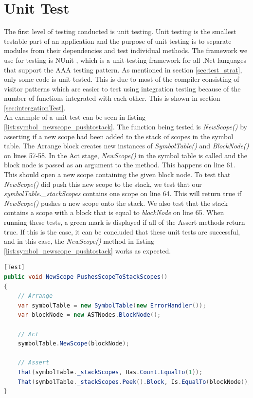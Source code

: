 \section{Unit Test}
The first level of testing conducted is unit testing. Unit testing is the smallest testable part of an application and the purpose of unit testing is to separate modules from their dependencies and test individual methods. The framework we use for testing is NUnit \cite{nunit}, which is a unit-testing framework for all .Net languages that support the AAA testing pattern. As mentioned in section \ref{sec:test_strat}, only some code is unit tested. This is due to most of the \lang compiler consisting of visitor patterns which are easier to test using integration testing because of the number of functions integrated with each other. This is shown in section \ref{sec:intergationTest}.\\

An example of a unit test can be seen in listing \ref{list:symbol_newscope_pushtostack}. The function being tested is \textit{NewScope()} by asserting if a new scope had been added to the stack of scopes in the symbol table. The Arrange block creates new instances of \textit{SymbolTable()} and \textit{BlockNode()} on lines 57-58. In the Act stage, \textit{NewScope()} in the symbol table is called and the block node is passed as an argument to the method. This happens on line 61. This should open a new scope containing the given block node. To test that \textit{NewScope()} did push this new scope to the stack, we test that our \textit{symbolTable.\_stackScopes} contains one scope on line 64. This will return true if \textit{NewScope()} pushes a new scope onto the stack. We also test that the stack contains a scope with a block that is equal to \textit{blockNode} on line 65. When running these tests, a green mark is displayed if all of the Assert methods return true. If this is the case, it can be concluded that these unit tests are successful, and in this case, the \textit{NewScope()} method in listing \ref{list:symbol_newscope_pushtostack} works as expected.

\begin{lstlisting}[language = csharp, firstnumber=53, label={list:symbol_newscope_pushtostack}, caption=Unit test of the NewScope() method that creates a new scope and tests if it pushes this scope to the stack - PEAKCompilerTesting / SymbolTableUnitTest.cs]
[Test]
public void NewScope_PushesScopeToStackScopes()
{
    // Arrange
    var symbolTable = new SymbolTable(new ErrorHandler());
    var blockNode = new ASTNodes.BlockNode();

    // Act
    symbolTable.NewScope(blockNode);

    // Assert
    That(symbolTable._stackScopes, Has.Count.EqualTo(1));
    That(symbolTable._stackScopes.Peek().Block, Is.EqualTo(blockNode));
}
\end{lstlisting}

